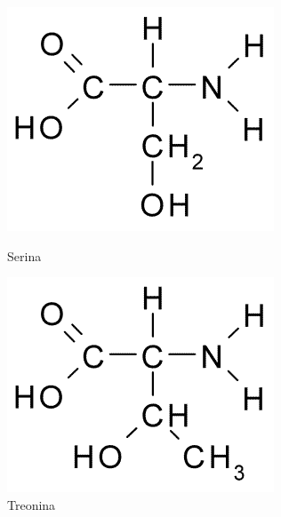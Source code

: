 \vspace{-1cm}
\begin{figure}[H]
	\begin{center}
		\begin{minipage}{0.45\linewidth}
			\centering   
			\includegraphics[width=0.5\linewidth]{secProteins/figures/serine.png}	
			\caption{Serina}
			\label{fig:serine}
		\end{minipage}
		\begin{minipage}{0.45\linewidth}
			\centering   
			\includegraphics[width=0.5\linewidth]{secProteins/figures/threonine.png}
			\caption{Treonina}
			\label{fig:threonine}
		\end{minipage}
	\end{center}
\end{figure}

